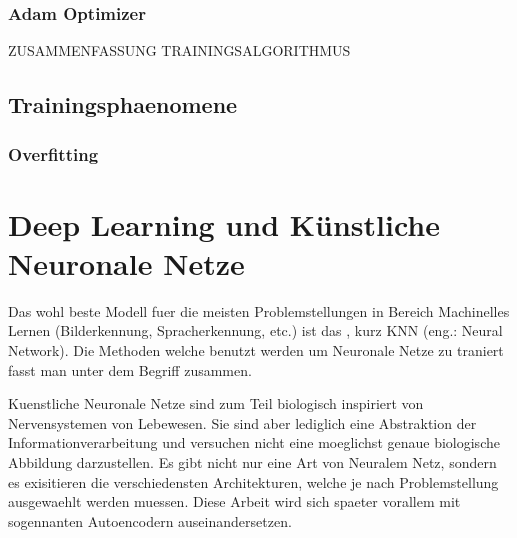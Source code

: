 \subsection{Adam Optimizer}
ZUSAMMENFASSUNG TRAININGSALGORITHMUS

\section{Trainingsphaenomene}

\subsection{Overfitting}

\pagebreak
\chapter{Deep Learning und Künstliche Neuronale Netze}
Das wohl beste Modell fuer die meisten Problemstellungen in Bereich Machinelles Lernen (Bilderkennung, Spracherkennung, etc.) ist das , kurz KNN (eng.: Neural Network).
Die Methoden welche benutzt werden um Neuronale Netze zu traniert fasst man unter dem Begriff  zusammen.

Kuenstliche Neuronale Netze sind zum Teil biologisch inspiriert von Nervensystemen von Lebewesen. Sie sind aber lediglich eine Abstraktion der Informationverarbeitung und versuchen nicht eine moeglichst genaue biologische Abbildung darzustellen.
Es gibt nicht nur eine Art von Neuralem Netz, sondern es exisitieren die
verschiedensten Architekturen, welche je nach Problemstellung ausgewaehlt werden
muessen. Diese Arbeit wird sich spaeter vorallem mit sogennanten Autoencodern auseinandersetzen.


